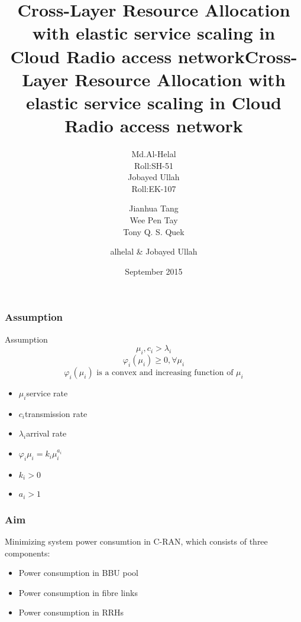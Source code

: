 \documentclass[usenames,dvipsnames]{beamer}
\begin{document}
  \title{Cross-Layer  Resource  Allocation with  elastic service scaling in Cloud Radio access network}
  \author[alhelal \& Jobayed Ullah]{
  \parbox{2.5cm}{
\centering Md.Al-Helal\\Roll:SH-51}\hspace{1cm}
\parbox{2.5cm}{
{\centering Jobayed Ullah\\Roll:EK-107}}
}
\begin{frame}
  \maketitle
\end{frame}
  \title{Cross-Layer  Resource  Allocation with  elastic service scaling in Cloud Radio access network}
  \author{Jianhua Tang\\ Wee Pen Tay\\ Tony Q. S. Quek}
\date{September 2015}
\begin{frame}
  \maketitle
\end{frame}
  \author{alhelal \& Jobayed Ullah}
\begin{frame}
  \frametitle{Assumption}
  \begin{exampleblock}{Assumption}
    \[
      \mu_{i},c_{i} > \lambda_{i}
    \]
    \[
      \varphi_{i}(\mu_{i})\geq 0, \forall \mu_{i}
    \]
    \[
      \varphi_{i}(\mu_{i}) \text{ is a convex and increasing function of } \mu_{i}
    \]
  \end{exampleblock}
  \begin{itemize}
    \item $\mu_{i}$\quad service rate
    \item $c_{i}$\quad transmission rate
    \item $\lambda_{i}$\quad arrival rate
    \item $\varphi_{i}{\mu_{i}} = k_{i}\mu_{i}^{a_{i}}$
    \item $k_{i} > 0$
    \item $a_{i} > 1$
  \end{itemize}
\end{frame}
\begin{frame}
  \frametitle{Aim}
  Minimizing system power consumtion in C-RAN, which consists of three components:
  \begin{itemize}
  \item Power consumption in BBU pool
  \item Power consumption in fibre links
  \item Power consumption in RRHs
  \end{itemize}
\end{frame}
\end{document}
